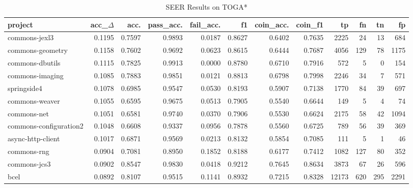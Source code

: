 \begin{table*}
\centering
\caption{SEER Results on TOGA*}
\label{tab:toga_results_all}
\begin{tabular}{lrrrrrrrrrrr}
\toprule
                project &  acc\_$\Delta$ &    acc. &  pass\_acc. &  fail\_acc. &      f1 &  coin\_acc. &  coin\_f1 &      tp &    fn &    tn &     fp \\
\midrule
          commons-jexl3 &      0.1195 &  0.7597 &     0.9893 &     0.0187 &  0.8627 &     0.6402 &   0.7635 &    2225 &    24 &    13 &    684 \\
       commons-geometry &      0.1158 &  0.7602 &     0.9692 &     0.0623 &  0.8615 &     0.6444 &   0.7687 &    4056 &   129 &    78 &   1175 \\
        commons-dbutils &      0.1115 &  0.7825 &     0.9913 &     0.0000 &  0.8780 &     0.6710 &   0.7916 &     572 &     5 &     0 &    154 \\
        commons-imaging &      0.1085 &  0.7883 &     0.9851 &     0.0121 &  0.8813 &     0.6798 &   0.7998 &    2246 &    34 &     7 &    571 \\
            springside4 &      0.1078 &  0.6985 &     0.9547 &     0.0530 &  0.8193 &     0.5907 &   0.7138 &    1770 &    84 &    39 &    697 \\
         commons-weaver &      0.1055 &  0.6595 &     0.9675 &     0.0513 &  0.7905 &     0.5540 &   0.6644 &     149 &     5 &     4 &     74 \\
            commons-net &      0.1051 &  0.6581 &     0.9740 &     0.0370 &  0.7906 &     0.5530 &   0.6624 &    2175 &    58 &    42 &   1094 \\
 commons-configuration2 &      0.1048 &  0.6608 &     0.9337 &     0.0956 &  0.7878 &     0.5560 &   0.6725 &     789 &    56 &    39 &    369 \\
      async-http-client &      0.1017 &  0.6871 &     0.9569 &     0.0213 &  0.8132 &     0.5854 &   0.7085 &     111 &     5 &     1 &     46 \\
            commons-rng &      0.0904 &  0.7081 &     0.8950 &     0.1852 &  0.8188 &     0.6177 &   0.7412 &    1082 &   127 &    80 &    352 \\
           commons-jcs3 &      0.0902 &  0.8547 &     0.9830 &     0.0418 &  0.9212 &     0.7645 &   0.8634 &    3873 &    67 &    26 &    596 \\
                   bcel &      0.0892 &  0.8107 &     0.9515 &     0.1141 &  0.8932 &     0.7215 &   0.8328 &   12173 &   620 &   295 &   2291 \\

\end{tabular}
\end{table*}
